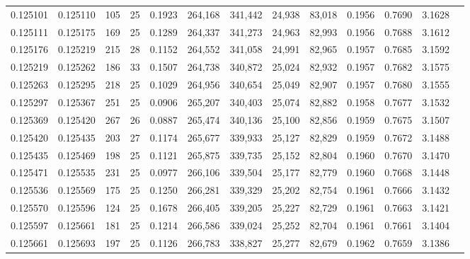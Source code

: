 \begin{tabular}{rrrrrrrrrrrrr}
0.125101 & 0.125110 & 105 &  25 &                                     0.1923 & 264,168 & 341,442 &  24,938 &  83,018 & 0.1956 & 0.7690 & 3.1628 \\
0.125111 & 0.125175 & 169 &  25 &                                     0.1289 & 264,337 & 341,273 &  24,963 &  82,993 & 0.1956 & 0.7688 & 3.1612 \\
0.125176 & 0.125219 & 215 &  28 &                                     0.1152 & 264,552 & 341,058 &  24,991 &  82,965 & 0.1957 & 0.7685 & 3.1592 \\
0.125219 & 0.125262 & 186 &  33 &                                     0.1507 & 264,738 & 340,872 &  25,024 &  82,932 & 0.1957 & 0.7682 & 3.1575 \\
0.125263 & 0.125295 & 218 &  25 &                                     0.1029 & 264,956 & 340,654 &  25,049 &  82,907 & 0.1957 & 0.7680 & 3.1555 \\
0.125297 & 0.125367 & 251 &  25 &                                     0.0906 & 265,207 & 340,403 &  25,074 &  82,882 & 0.1958 & 0.7677 & 3.1532 \\
0.125369 & 0.125420 & 267 &  26 &                                     0.0887 & 265,474 & 340,136 &  25,100 &  82,856 & 0.1959 & 0.7675 & 3.1507 \\
0.125420 & 0.125435 & 203 &  27 &                                     0.1174 & 265,677 & 339,933 &  25,127 &  82,829 & 0.1959 & 0.7672 & 3.1488 \\
0.125435 & 0.125469 & 198 &  25 &                                     0.1121 & 265,875 & 339,735 &  25,152 &  82,804 & 0.1960 & 0.7670 & 3.1470 \\
0.125471 & 0.125535 & 231 &  25 &                                     0.0977 & 266,106 & 339,504 &  25,177 &  82,779 & 0.1960 & 0.7668 & 3.1448 \\
0.125536 & 0.125569 & 175 &  25 &                                     0.1250 & 266,281 & 339,329 &  25,202 &  82,754 & 0.1961 & 0.7666 & 3.1432 \\
0.125570 & 0.125596 & 124 &  25 &                                     0.1678 & 266,405 & 339,205 &  25,227 &  82,729 & 0.1961 & 0.7663 & 3.1421 \\
0.125597 & 0.125661 & 181 &  25 &                                     0.1214 & 266,586 & 339,024 &  25,252 &  82,704 & 0.1961 & 0.7661 & 3.1404 \\
0.125661 & 0.125693 & 197 &  25 &                                     0.1126 & 266,783 & 338,827 &  25,277 &  82,679 & 0.1962 & 0.7659 & 3.1386 \\

\end{tabular}
